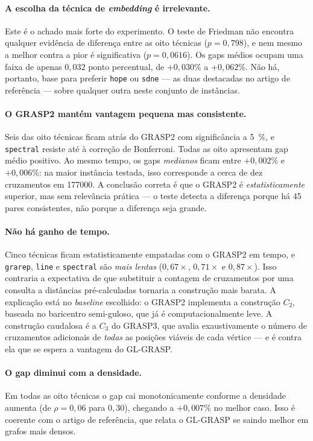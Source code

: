 \documentclass[12pt,a4paper]{article}
\begin{document}
\paragraph{A escolha da técnica de \textit{embedding} é irrelevante.}
Este é o achado mais forte do experimento. O teste de Friedman não
encontra qualquer evidência de diferença entre as oito técnicas
($p = 0{,}798$), e nem mesmo a melhor contra a pior é significativa
($p = 0{,}0616$). Os gaps médios ocupam uma faixa de apenas
$0{,}032$ ponto percentual, de $+0{,}030\%$ a $+0{,}062\%$. Não há,
portanto, base para preferir \texttt{hope} ou \texttt{sdne} --- as duas
destacadas no artigo de referência --- sobre qualquer outra neste
conjunto de instâncias.

\paragraph{O GRASP2 mantém vantagem pequena mas consistente.}
Seis das oito técnicas ficam atrás do GRASP2 com significância a
\SI{5}{\percent}, e \texttt{spectral} resiste até à correção de
Bonferroni. Todas as oito apresentam gap médio positivo. Ao mesmo tempo,
os gaps \emph{medianos} ficam entre $+0{,}002\%$ e $+0{,}006\%$: na maior
instância testada, isso corresponde a cerca de dez cruzamentos em
\num{177000}. A conclusão correta é que o GRASP2 é
\emph{estatisticamente} superior, mas sem relevância prática --- o teste
detecta a diferença porque há 45 pares consistentes, não porque a
diferença seja grande.

\paragraph{Não há ganho de tempo.}
Cinco técnicas ficam estatisticamente empatadas com o GRASP2 em tempo, e
\texttt{grarep}, \texttt{line} e \texttt{spectral} são \emph{mais lentas}
($0{,}67\times$, $0{,}71\times$ e $0{,}87\times$). Isso contraria a
expectativa de que substituir a contagem de cruzamentos por uma consulta
a distâncias pré-calculadas tornaria a construção mais barata. A
explicação está no \textit{baseline} escolhido: o GRASP2 implementa a
construção $C_2$, baseada no baricentro semi-guloso, que já é
computacionalmente leve. A construção caudalosa é a $C_3$ do GRASP3, que
avalia exaustivamente o número de cruzamentos adicionais de \emph{todas}
as posições viáveis de cada vértice --- e é contra ela que se espera a
vantagem do GL-GRASP.

\paragraph{O gap diminui com a densidade.}
Em todas as oito técnicas o gap cai monotonicamente conforme a densidade
aumenta (de $\rho = 0{,}06$ para $0{,}30$), chegando a
$+0{,}007\%$ no melhor caso. Isso é coerente com o artigo de referência,
que relata o GL-GRASP se saindo melhor em grafos mais densos.
\end{document}
